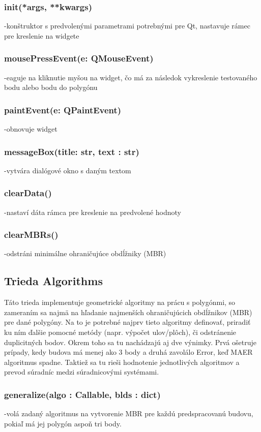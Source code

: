 \documentclass[12pt]{article}
\begin{document}
\subsubsection*{\textunderscore \textunderscore init\textunderscore \textunderscore(*args, **kwargs)}
\noindent-konštruktor s predvolenými parametrami potrebnými pre Qt, nastavuje rámec pre kreslenie na widgete
\subsubsection*{mousePressEvent(e: QMouseEvent)}
\noindent-eaguje na kliknutie myšou na widget, čo má za následok vykreslenie testovaného bodu alebo bodu do polygónu
\subsubsection*{paintEvent(e: QPaintEvent)}
\noindent-obnovuje widget
\subsubsection*{messageBox(title: str, text : str)}
\noindent-vytvára dialógové okno s daným textom
\subsubsection*{clearData()}
\noindent-nastaví dáta rámca pre kreslenie na predvolené hodnoty
\subsubsection*{clearMBRs()}
\noindent-odstráni minimálne ohraničujúce obdĺžniky (MBR)
\subsection*{Trieda Algorithms}
Táto trieda implementuje geometrické algoritmy na prácu s polygónmi, so zameraním sa najmä na hľadanie najmenších ohraničujúcich obdĺžnikov (MBR) pre dané polygóny. Na to je potrebné najprv tieto algoritmy definovať, priradiť ku ním ďalšie pomocné metódy (napr. výpočet ulov/plôch), či odstránenie duplicitných bodov. Okrem toho sa tu nachádzajú aj dve výnimky. Prvá ošetruje prípady, kedy budova má menej ako 3 body a druhá zavolálo Error, keď MAER algoritmus spadne. Taktiež sa tu rieši hodnotenie jednotlivých algoritmov a prevod súradníc medzi súradnicovými systémami.
\subsubsection*{generalize(algo : Callable, blds : dict)}
\noindent-volá zadaný algoritmus na vytvorenie MBR pre každú predspracovanú budovu, pokiaľ má jej polygón aspoň tri body. 
\end{document}
